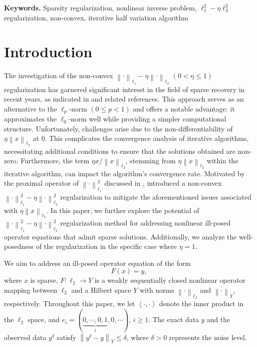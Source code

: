 \documentclass[a4paper,12pt]{article}
\numberwithin{equation}{section}
\begin{document}
\smallskip
{\bf Keywords.}  Sparsity regularization, nonlinear inverse problem, $\ell_{1}^{2}-\eta\ell_{2}^{2}$ regularization, non-convex, iterative half variation algorithm

\section{Introduction}\label{sec1}

\par The investigation of the non-convex $\left\|\cdot\right\|_{\ell_{1}}- \eta\left\|\cdot\right\|_{\ell_{2}}$ $\left(0<\eta\leq 1\right)$ regularization has garnered significant interest in the field of sparse recovery in recent years, as indicated in \cite{DH19, LCGN20, LY18, YL15} and related references. This approach serves as an alternative to the $\ell_{p}$-norm $\left(0\leq p<1\right)$ and offers a notable advantage: it approximates the $\ell_{0}$-norm well while providing a simpler computational structure. Unfortunately, challenges arise due to the non-differentiability of $\eta\left\|x\right\|_{\ell_{2}}$ at $0$. This complicates the convergence analysis of iterative algorithms, necessitating additional conditions to ensure that the solutions obtained are non-zero. Furthermore, the term $\eta x/\left\|x\right\|_{\ell_{2}}$, stemming from $\eta\left\|x\right\|_{\ell_{2}}$ within the iterative algorithm, can impact the algorithm's convergence rate. Motivated by the proximal operator of $\left\|\cdot\right\|_{\ell_{1}}^{2}$ discussed in \cite{B17}, \cite{LD25} introduced a non-convex $\left\|\cdot\right\|_{\ell_{1}}^{2}-\eta\left\|\cdot\right\|_{\ell_{2}}^{2}$ regularization to mitigate the aforementioned issues associated with $\eta\left\|x\right\| _{\ell_{2}}$. In this paper, we further explore the potential of $\left\|\cdot\right\|_{\ell_{1}}^{2}-\eta\left\|\cdot\right\|_{\ell_{2}}^{2}$ regularization method for addressing nonlinear ill-posed operator equations that admit sparse solutions. Additionally, we analyze the well-posedness of the regularization in the specific case where $\eta=1$.

\par We aim to address an ill-posed operator equation of the form
\begin{equation}\label{equ1.1}
     F\left(x\right)=y,
\end{equation}
where $x$ is sparse, $F:\ell_{2}\rightarrow Y$ is a weakly sequentially closed nonlinear operator mapping between $\ell_{2}$ and a Hilbert space $Y$ with norms $\left\|\cdot\right\|_{\ell_{2}}$ and $\left\|\cdot\right\|_{Y}$, respectively. Throughout this paper, we let $\left<\cdot,\cdot\right>$ denote the inner product in the $\ell_{2}$ space, and $e_{i}=(\underbrace{0,\cdots,0,1}_{i},0,\cdots)$, $i\geq 1$. The exact data $y$ and the observed data $y^{\delta}$ satisfy $\left\|y^{\delta}-y\right\|_{Y}\leq \delta$, where $\delta> 0$ represents the noise level.
\end{document}
